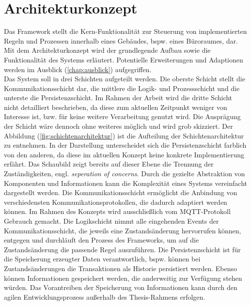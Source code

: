\section{Architekturkonzept}
\label{sec:architekturkonzept}
    Das Framework stellt die Kern-Funktionalität zur Steuerung von implementierten Regeln und Prozessen innerhalb eines 
    Gebäudes, bspw. eines Büroraumes, dar. Mit dem Architekturkonzept wird der grundlegende Aufbau sowie die Funktionalität des Systems erläutert. 
    Potentielle Erweiterungen und Adaptionen werden im Ausblick (\ref{chap:ausblick}) aufgegriffen.
    \\ 
    \linebreak
    Das System soll in drei Schichten aufgeteilt werden. Die oberste Schicht stellt die Kommunikationsschicht dar, die mittlere 
    die Logik- und Prozessschicht und die unterste die Persistenzschicht. Im Rahmen der Arbeit wird 
    die dritte Schicht nicht detailliert beschrieben, da diese zum aktuellen Zeitpunkt weniger von Interesse ist, bzw. für keine weitere Verarbeitung 
    genutzt wird. Die Ausprägung der Schicht wäre dennoch ohne weiteres möglich und wird grob skizziert. Der Abbildung 
    (\ref{fig:schichtenarchitektur}) ist die Aufteilung der Schichtenarchitektur zu entnehmen. In der Darstellung unterscheidet sich die 
    Persistenzschicht farblich von den anderen, da diese im aktuellen Konzept keine konkrete Implementierung erfährt. 
    Das Schaubild zeigt bereits auf dieser Ebene die Trennung der Zuständigkeiten, engl. \textit{seperation of concerns}. 
    Durch die gezielte Abstraktion von Komponenten und Informationen kann die Komplexität 
    eines Systems vereinfacht dargestellt werden. Die Kommunikationsschicht ermöglicht die Anbindung von verschiedensten Kommunikationsprotokollen, die 
    dadurch adaptiert werden können. Im Rahmen des Konzepts wird ausschließlich vom \acs{MQTT}-Protokoll Gebrauch gemacht. 
    Die Logikschicht nimmt alle eingehenden Events der Kommunikationsschicht, die jeweils eine Zustandsänderung hervorrufen können, entgegen 
    und durchläuft den Prozess des Frameworks, um auf die Zustandsänderung die passende Regel auszuführen. Die 
    Persistenzschicht ist für die Speicherung erzeugter Daten verantwortlich, bspw. können bei Zustandsänderungen die Transaktionen 
    als Historie persistiert werden. Ebenso können Informationen gespeichert werden, die anderweitig zur Verfügung stehen würden. Das Vorantreiben der Speicherung 
    von Informationen kann durch den agilen Entwicklungsprozess außerhalb des Thesis-Rahmens erfolgen. 
